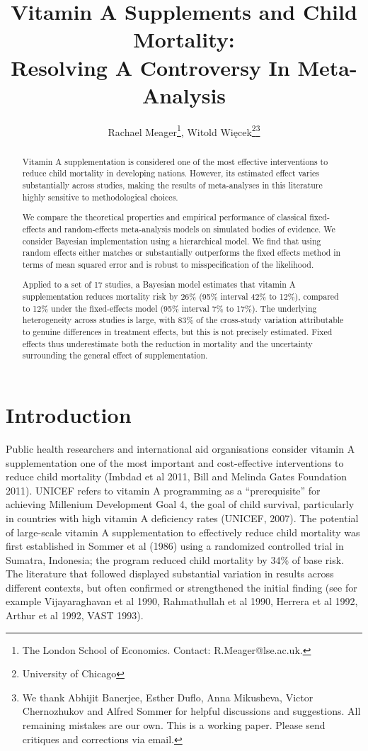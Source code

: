 \documentclass[12pt]{article}
\title{\Large Vitamin A Supplements and Child Mortality:\\ Resolving A Controversy In Meta-Analysis\\
}
\author{Rachael Meager\footnote{The London School of Economics. Contact: R.Meager@lse.ac.uk.}, Witold Więcek\footnote{University of Chicago}\;\thanks{We thank Abhijit Banerjee, Esther Duflo, Anna Mikusheva, Victor Chernozhukov and Alfred Sommer for helpful discussions and suggestions. All remaining mistakes are our own. This is a working paper. Please send critiques and corrections via email.  }}
\begin{document}
\maketitle

\begin{abstract}
Vitamin A supplementation is considered one of the most effective interventions to reduce child mortality in developing nations. However, its estimated effect varies substantially across studies, making the results of meta-analyses in this literature highly sensitive to methodological choices. 

We compare the theoretical properties and empirical performance of classical fixed-effects and  random-effects meta-analysis models on simulated bodies of evidence. We consider Bayesian implementation using a hierarchical model. We find that using random effects either matches or substantially outperforms the fixed effects method in terms of mean squared error and is robust to misspecification of the likelihood. 

Applied to a set of 17 studies, a Bayesian model estimates that vitamin A supplementation reduces mortality risk by 26\% (95\% interval 42\% to 12\%), compared to 12\% under the fixed-effects model (95\% interval 7\% to 17\%). 
The underlying heterogeneity across studies is large, with 83\% of the cross-study variation attributable to genuine differences in treatment effects, but this is not precisely estimated. 
Fixed effects thus underestimate both the reduction in mortality and the uncertainty surrounding the general effect of supplementation. 

\end{abstract}

\section{Introduction}
Public health researchers and international aid organisations consider vitamin A supplementation one of the most important and cost-effective interventions to reduce child mortality (Imbdad et al 2011, Bill and Melinda Gates Foundation 2011). UNICEF refers to vitamin A programming as a ``prerequisite'' for achieving Millenium Development Goal 4, the goal of child survival, particularly in countries with high vitamin A deficiency rates (UNICEF, 2007).  The potential of large-scale vitamin A supplementation to effectively reduce child mortality was first established in Sommer et al (1986) using a randomized controlled trial in Sumatra, Indonesia; the program reduced child mortality by 34\% of base risk. The literature that followed displayed substantial variation in results across different contexts, but often confirmed or strengthened the initial finding (see for example Vijayaraghavan et al 1990, Rahmathullah et al 1990, Herrera et al 1992, Arthur et al 1992, VAST 1993). 
\end{document}
